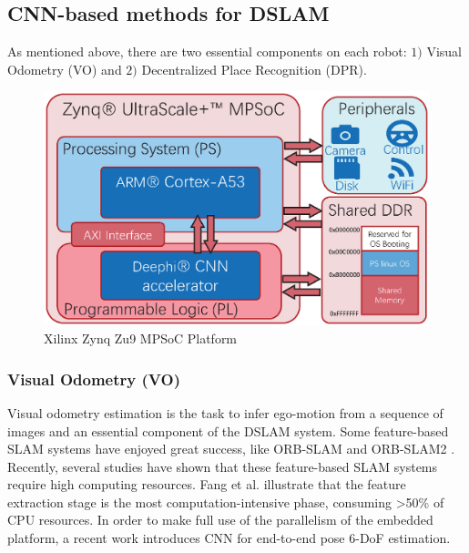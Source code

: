 \label{sec:background}
\subsection{CNN-based methods for DSLAM}
As mentioned above, there are two essential components on each robot: $1)$ Visual Odometry (VO) and $2)$ Decentralized Place Recognition (DPR).


\begin{figure}[thb]  
    \centering  
    \includegraphics[width=0.95\linewidth]{fig/plps.eps}
    \caption{Xilinx Zynq Zu9 MPSoC Platform}
    \label{fig:plps}
\end{figure}

\subsubsection{Visual Odometry (VO)}

Visual odometry estimation is the task to infer ego-motion from a sequence of images and an essential component of the DSLAM system. Some feature-based SLAM systems have enjoyed great success, like ORB-SLAM \cite{DBLP:journals/trob/Mur-ArtalMT15} and ORB-SLAM2 \cite{Mur-Artal:2017281}. Recently, several studies have shown that these feature-based SLAM systems require high computing resources. Fang et al. \cite{Fang2017FPGAbasedOF} illustrate that the feature extraction stage is the most computation-intensive phase, consuming >50\% of CPU resources. In order to make full use of the parallelism of the embedded platform, a recent work \cite{Zhan:2018e92} introduces CNN for end-to-end pose 6-DoF estimation.


